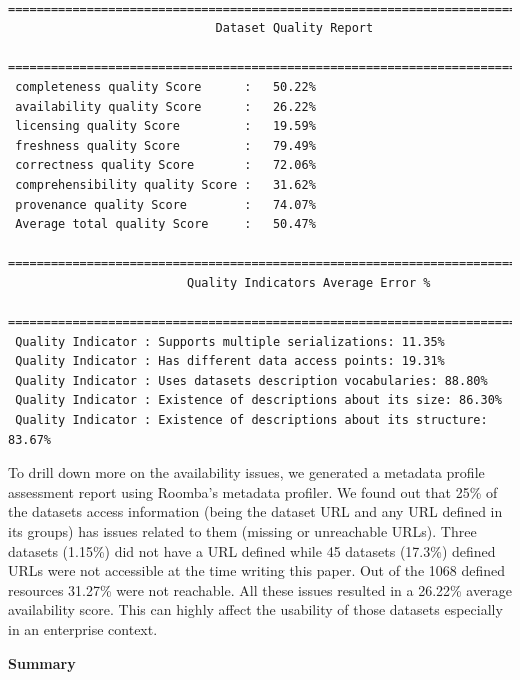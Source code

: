 \documentclass[onecolumn, crcready]{../../Util/LaTEX/iosart2c}
\begin{document}
\begin{lstlisting}
 =================================================================================
                             Dataset Quality Report
 =================================================================================
 completeness quality Score      :   50.22%
 availability quality Score      :   26.22%
 licensing quality Score         :   19.59%
 freshness quality Score         :   79.49%
 correctness quality Score       :   72.06%
 comprehensibility quality Score :   31.62%
 provenance quality Score        :   74.07%
 Average total quality Score     :   50.47%
 =================================================================================
                         Quality Indicators Average Error %
 =================================================================================
 Quality Indicator : Supports multiple serializations: 11.35%
 Quality Indicator : Has different data access points: 19.31%
 Quality Indicator : Uses datasets description vocabularies: 88.80%
 Quality Indicator : Existence of descriptions about its size: 86.30%
 Quality Indicator : Existence of descriptions about its structure: 83.67%
\end{lstlisting}

To drill down more on the availability issues, we generated a metadata profile assessment report using Roomba's metadata profiler. We found out that 25\% of the datasets access information (being the dataset URL and any URL defined in its groups) has issues related to them (missing or unreachable URLs).
Three datasets (1.15\%) did not have a URL defined while 45 datasets (17.3\%) defined URLs were not accessible at the time writing this paper. Out of the 1068 defined resources 31.27\% were not reachable. All these issues resulted in a 26.22\% average availability score. This can highly affect the usability of those datasets especially in an enterprise context.

\noindent

\textbf{Summary}
\end{document}
